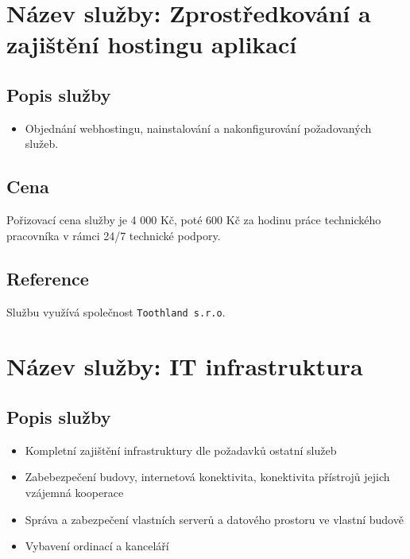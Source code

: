 \documentclass[12pt, a4paper, titlepage]{article}
\begin{document}
	\newpage

	\noindent\makebox[\linewidth]{\rule{16cm}{0.4pt}}

	\section*{Název služby: Zprostředkování a zajištění hostingu aplikací}	
	\vspace{1em}
	\subsection*{Popis služby}
	\begin{itemize}
		\item Objednání webhostingu, nainstalování a nakonfigurování požadovaných služeb.
	\end{itemize}

	\subsection*{Cena}
	Pořizovací cena služby je 4 000 Kč, poté 600 Kč za hodinu práce technického pracovníka v rámci 24/7 technické podpory.

	\subsection*{Reference}
	Službu využívá společnost \texttt{Toothland s.r.o}.

	\noindent\makebox[\linewidth]{\rule{16cm}{0.4pt}}

	\section*{Název služby: IT infrastruktura}

	\subsection*{Popis služby}
	\begin{itemize}
		\item Kompletní zajištění infrastruktury dle požadavků ostatní služeb
		\item Zabebezpečení budovy, internetová konektivita, konektivita přístrojů jejich vzájemná kooperace
		\item Správa a zabezpečení vlastních serverů a datového prostoru ve vlastní budově
		\item Vybavení ordinací a kanceláří
	\end{itemize}
\end{document}

